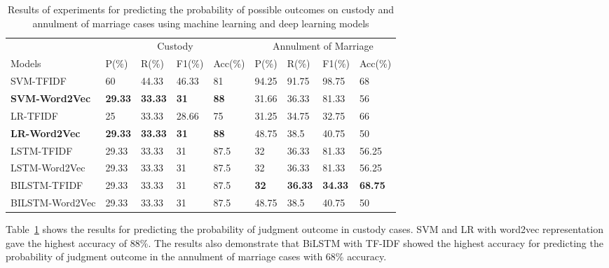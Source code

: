 \documentclass[sn-mathphys,Numbered]{sn-jnl}%
\theoremstyle{thmstyleone}%
\theoremstyle{thmstyletwo}%
\theoremstyle{thmstylethree}%
\begin{document}
\begin{table}[h]
\begin{tabular}{|l|l|l|l|l|l|l|l|l|}
\hline
    & \multicolumn{4}{c|}{Custody}   & \multicolumn{4}{c|}{Annulment of Marriage}  \\
         \hhline{~|--------}

Models   & P(\%) & R(\%) & F1(\%) & Acc(\%) & P(\%) & R(\%) & F1(\%) & Acc(\%)    \\ \hline
    SVM-TFIDF & 60 & 44.33 & 46.33 & 81 & 94.25 & 91.75 & 98.75 & 68 \\ \hline
        \textbf{SVM-Word2Vec} & \textbf{29.33} & \textbf{33.33} & \textbf{31} & \textbf{88} & 31.66 & 36.33 & 81.33 & 56 \\ \hline
        LR-TFIDF & 25 & 33.33 & 28.66 & 75 & 31.25 & 34.75 & 32.75 & 66 \\ \hline
       \textbf{ LR-Word2Vec} & \textbf{29.33} & \textbf{33.33} & \textbf{31} & \textbf{88} &48.75  & 38.5  & 40.75 & 50 \\ \hline
        LSTM-TFIDF & 29.33 & 33.33 & 31 & 87.5  & 32 & 36.33 & 81.33 & 56.25 \\ \hline
        LSTM-Word2Vec & 29.33 & 33.33 & 31 & 87.5 & 32 & 36.33 & 81.33 & 56.25 \\ \hline
        BILSTM-TFIDF & 29.33  & 33.33 & 31& 87.5  & \textbf{32} & \textbf{36.33} & \textbf{34.33} & \textbf{68.75} \\ \hline
        BILSTM-Word2Vec & 29.33 & 33.33 & 31 & 87.5 & 48.75 & 38.5 & 40.75 & 50 \\ \hline                 
\end{tabular}
\caption{Results of experiments for predicting the probability of possible outcomes on custody and annulment of marriage cases using machine learning and deep learning models}
\label{Results of experiments for predicting the probability of possible outcomes on custody and annulment of marriage cases}
\end{table}



Table~\ref{Results of experiments for predicting the probability of possible outcomes on custody and annulment of marriage cases} shows the results for predicting the probability of judgment outcome in custody cases. SVM and LR with word2vec representation gave the highest accuracy of 88\%. The results also demonstrate that BiLSTM with TF-IDF showed the highest accuracy for predicting the probability of judgment outcome in the annulment of marriage cases with 68\% accuracy. %
\end{document}
